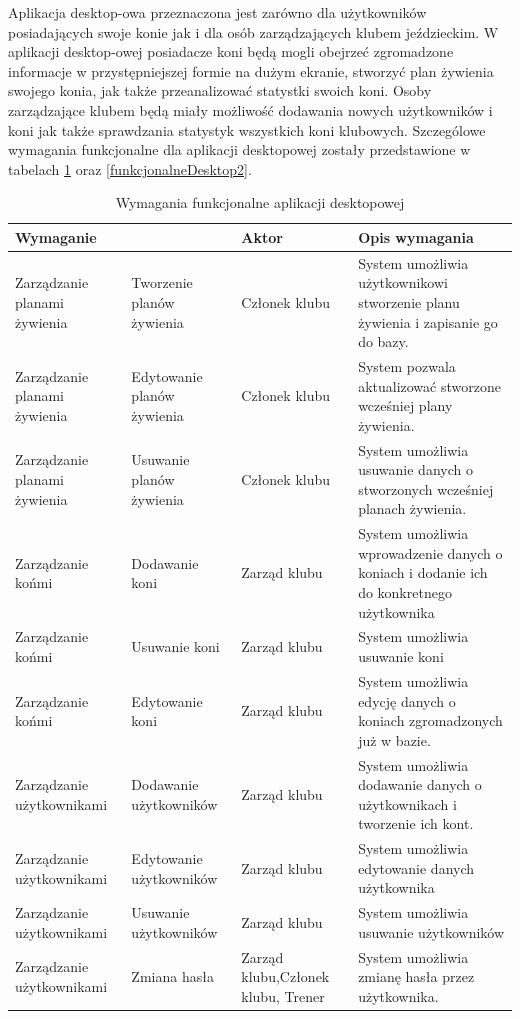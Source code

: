 \documentclass[12pt,oneside]{report}
\begin{document}
Aplikacja desktop-owa przeznaczona jest zarówno dla użytkowników posiadających swoje konie jak i dla osób zarządzających klubem jeździeckim. W aplikacji desktop-owej posiadacze koni będą mogli obejrzeć zgromadzone informacje w przystępniejszej formie na dużym ekranie, stworzyć plan żywienia swojego konia, jak także przeanalizować statystki swoich koni. Osoby zarządzające klubem będą miały możliwość dodawania nowych użytkowników i koni jak także sprawdzania statystyk wszystkich koni klubowych. Szczególowe wymagania funkcjonalne dla aplikacji desktopowej zostały przedstawione w tabelach \ref{funkcjonalneDesktop1} oraz \ref{funkcjonalneDesktop2}.
\begin{table}[H]
	\centering
	\begin{tabular}{|p{3cm}|p{3cm}|p{4cm}|p{6cm}|}			
		\hline
		\multicolumn{2}{|l|}{Wymaganie} & Aktor & Opis wymagania\\
		\hline
		Zarządzanie planami żywienia & Tworzenie planów żywienia  & Członek klubu & System umożliwia użytkownikowi stworzenie planu żywienia i zapisanie go do bazy.\\		
		\hline
		Zarządzanie planami żywienia & Edytowanie planów żywienia  & Członek klubu & System pozwala aktualizować stworzone wcześniej plany żywienia.\\
		\hline
		Zarządzanie planami żywienia & Usuwanie planów żywienia  & Członek klubu & System umożliwia usuwanie danych o stworzonych wcześniej planach żywienia.\\
		\hline
		Zarządzanie końmi& Dodawanie koni & Zarząd klubu & System umożliwia wprowadzenie danych o koniach i dodanie ich do konkretnego użytkownika\\ 		
		\hline
		Zarządzanie końmi& Usuwanie koni & Zarząd klubu & System umożliwia usuwanie koni\\ 		
		\hline
		Zarządzanie końmi& Edytowanie koni & Zarząd klubu & System umożliwia edycję danych o koniach zgromadzonych już w bazie.\\ 
		\hline
		Zarządzanie użytkownikami & Dodawanie użytkowników & Zarząd klubu & System umożliwia dodawanie danych o użytkownikach i tworzenie ich kont.\\		
		\hline
		Zarządzanie użytkownikami & Edytowanie użytkowników & Zarząd klubu & System umożliwia edytowanie danych użytkownika\\		
		\hline
		Zarządzanie użytkownikami & Usuwanie użytkowników & Zarząd klubu & System umożliwia usuwanie użytkowników\\
		\hline
		Zarządzanie użytkownikami & Zmiana hasła & Zarząd klubu,Członek klubu, Trener& System umożliwia zmianę hasła przez użytkownika.\\
		\hline
		
	\end{tabular}
\caption{Wymagania funkcjonalne aplikacji desktopowej}
\label{funkcjonalneDesktop1}
\end{table}
\end{document}

